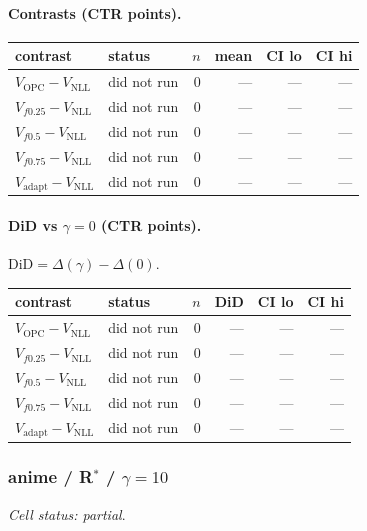 \documentclass[10pt,a4paper]{article}
\begin{document}
\paragraph{Contrasts (CTR points).}
{\centering\small\begin{tabular}{llrrrr}
\toprule contrast & status & $n$ & mean & CI lo & CI hi \\
\midrule
$V_{\mathrm{OPC}}-V_{\mathrm{NLL}}$ & did not run & 0 & --- & --- & --- \\
$V_{f0.25}-V_{\mathrm{NLL}}$ & did not run & 0 & --- & --- & --- \\
$V_{f0.5}-V_{\mathrm{NLL}}$ & did not run & 0 & --- & --- & --- \\
$V_{f0.75}-V_{\mathrm{NLL}}$ & did not run & 0 & --- & --- & --- \\
$V_{\mathrm{adapt}}-V_{\mathrm{NLL}}$ & did not run & 0 & --- & --- & --- \\
\bottomrule\end{tabular}\par}
\paragraph{DiD vs $\gamma=0$ (CTR points).} $\mathrm{DiD}=\Delta(\gamma)-\Delta(0)$.
{\centering\small\begin{tabular}{llrrrr}
\toprule contrast & status & $n$ & DiD & CI lo & CI hi \\
\midrule
$V_{\mathrm{OPC}}-V_{\mathrm{NLL}}$ & did not run & 0 & --- & --- & --- \\
$V_{f0.25}-V_{\mathrm{NLL}}$ & did not run & 0 & --- & --- & --- \\
$V_{f0.5}-V_{\mathrm{NLL}}$ & did not run & 0 & --- & --- & --- \\
$V_{f0.75}-V_{\mathrm{NLL}}$ & did not run & 0 & --- & --- & --- \\
$V_{\mathrm{adapt}}-V_{\mathrm{NLL}}$ & did not run & 0 & --- & --- & --- \\
\bottomrule\end{tabular}\par}
\bigskip
\subsubsection{anime / R$^*$ / $\gamma=10$}
\emph{Cell status: partial}.
\end{document}
